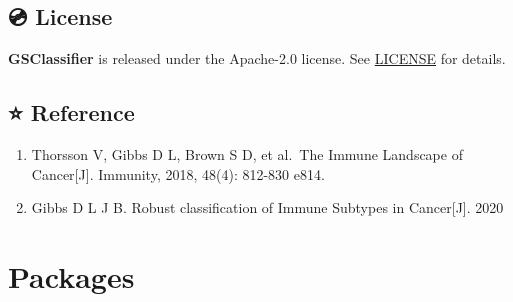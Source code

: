 \documentclass[
  12pt,
]{book}
\providecommand{\tightlist}{%
  \setlength{\itemsep}{0pt}\setlength{\parskip}{0pt}}
\begin{document}
\hypertarget{license}{%
\subsection{💿 License}\label{license}}

\textbf{GSClassifier} is released under the Apache-2.0 license. See \href{https://github.com/huangwb8/GSClassifier/blob/master/license.txt}{LICENSE} for details.

\hypertarget{reference}{%
\subsection{⭐ Reference}\label{reference}}

\begin{enumerate}
\def\labelenumi{\arabic{enumi}.}
\tightlist
\item
  Thorsson V, Gibbs D L, Brown S D, et al.~The Immune Landscape of Cancer{[}J{]}. Immunity, 2018, 48(4): 812-830 e814.
\item
  Gibbs D L J B. Robust classification of Immune Subtypes in Cancer{[}J{]}. 2020
\end{enumerate}

\hypertarget{packages}{%
\section{Packages}\label{packages}}
\end{document}
